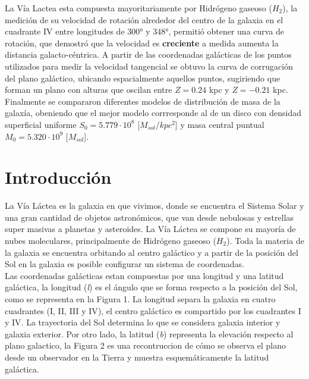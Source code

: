\documentclass[letterpaper,oneside]{article}
\begin{document}
	
\templatePortrait

\templatePagecfg

\begin{resumen}
La Vía Lactea esta compuesta mayoritariamente por Hidrógeno gaseoso ($H_2$), la medición de su velocidad de rotación alrededor del centro de la galaxia en el cuadrante \textrm{IV} entre longitudes de 300° y 348°, permitió obtener una curva de rotación, que demostró que la velocidad es \textbf{creciente} a medida aumenta la distancia galacto-céntrica. A partir de las coordenadas galácticas de los puntos utilizados para medir la velocidad tangencial se obtuvo la curva de corrugación del plano galáctico, ubicando espacialmente aquellos puntos, sugiriendo que forman un plano con alturas que oscilan entre $Z=0.24$ kpc y $Z=-0.21$ kpc.\\

Finalmente se compararon diferentes modelos de distribución de masa de la galaxía, obeniendo que el mejor modelo corrresponde al de un disco con densidad superficial uniforme $S_0 = 5.779 \cdot 10^{8}$ [$M_{sol}/kpc^{2}$] y masa central puntual $M_0 = 5.320 \cdot 10^{9}$ [$M_{sol}$].
\end{resumen}


\templateFinalcfg


\section{Introducción}
La Vía Láctea es la galaxia en que vivimos, donde se encuentra el Sistema Solar y una gran cantidad de objetos astronómicos, que van desde nebulosas y estrellas super masivas a planetas y asteroides. La Vía Láctea se compone su mayoría de nubes moleculares, principalmente de Hidrógeno gaseoso ($H_2$). Toda la materia de la galaxia se encuentra orbitando al centro galáctico y a partir de la posición del Sol en la galaxia es posible configurar un sistema de coordenadas.\\

Las coordenadas galácticas estan compuestas por una longitud y una latitud galáctica, la longitud (\emph{l}) es el ángulo que se forma respecto a la posición del Sol, como se representa en la Figura 1. La longitud separa la galaxia en cuatro cuadrantes (\textrm{I}, \textrm{II}, \textrm{III} y \textrm{IV}), el centro galáctico es compartido por los cuadrantes \textrm{I} y \textrm{IV}. La trayectoria del Sol determina lo que se considera galaxia interior y galaxia exterior. Por otro lado, la latitud (\emph{b}) representa la elevación respecto al plano galactico, la Figura 2 es una recontruccion de cómo se observa el plano desde un observador en la Tierra y muestra esquemáticamente la latitud galáctica.
\end{document}
